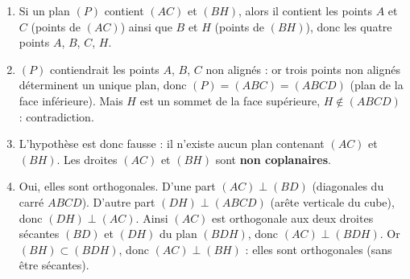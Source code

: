 \documentclass[11pt]{article}
\begin{document}
\begin{corrige}
\begin{enumerate}
\item Si un plan $(P)$ contient $(AC)$ et $(BH)$, alors il contient les points $A$ et $C$ (points de $(AC)$) ainsi que $B$ et $H$ (points de $(BH)$), donc les quatre points $A$, $B$, $C$, $H$.
\item $(P)$ contiendrait les points $A$, $B$, $C$ non alignés : or trois points non alignés déterminent un unique plan, donc $(P) = (ABC) = (ABCD)$ (plan de la face inférieure). Mais $H$ est un sommet de la face supérieure, $H \notin (ABCD)$ : contradiction.
\item L'hypothèse est donc fausse : il n'existe aucun plan contenant $(AC)$ et $(BH)$. Les droites $(AC)$ et $(BH)$ sont \textbf{non coplanaires}.
\item Oui, elles sont orthogonales. D'une part $(AC) \perp (BD)$ (diagonales du carré $ABCD$). D'autre part $(DH) \perp (ABCD)$ (arête verticale du cube), donc $(DH) \perp (AC)$. Ainsi $(AC)$ est orthogonale aux deux droites sécantes $(BD)$ et $(DH)$ du plan $(BDH)$, donc $(AC) \perp (BDH)$. Or $(BH) \subset (BDH)$, donc $(AC) \perp (BH)$ : elles sont orthogonales (sans être sécantes).
\end{enumerate}
\end{corrige}
\end{document}
